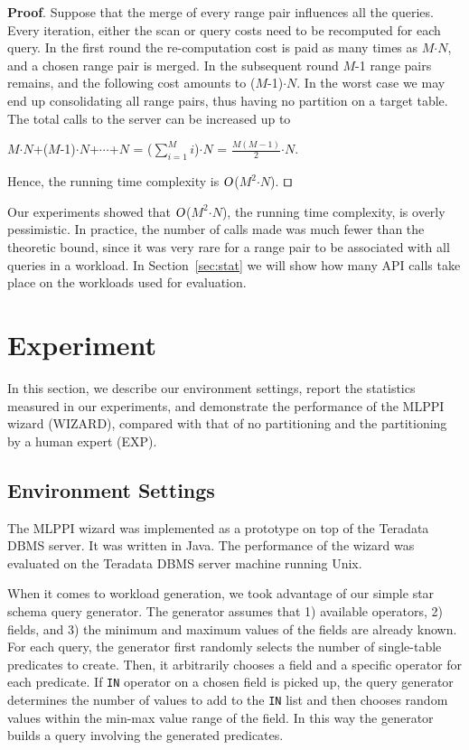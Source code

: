 \documentclass[runningheads]{comsis2}
\def\BigO{\mbox{\sl O}}
\begin{document}
{\bf Proof}. Suppose that the merge of every range pair influences all the queries. 
Every iteration, either the scan or query costs need to be recomputed 
for each query. 
In the first round the \hbox{re-computation} cost is paid as many times as $M${$\cdot$}$N$, 
and a chosen range pair is merged. In the subsequent round 
$M$-1 range pairs remains, and the following cost amounts to ($M$-1){$\cdot$}$N$. 
In the worst case we may end up consolidating all range pairs, thus having no partition on 
a target table. The total calls to the server can be increased up to 

\begin{center}
$M${$\cdot$}$N$+($M$-1){$\cdot$}$N$+$\cdots$+$N$ = ($\sum_{i=1}^M i$){$\cdot$}$N$ = $\frac{M(M-1)}{2}${$\cdot$}$N$. 
\end{center}

\noindent Hence, the running time complexity is $\BigO$($M^{2}${$\cdot$}$N$). $\qed$


Our experiments showed that $\BigO$($M^{2}${$\cdot$}$N$), the running time complexity, 
is overly pessimistic. 
In \hbox{practice}, the number of calls made was much fewer than the \hbox{theoretic} bound, 
since it was very rare for a range pair to be associated with all queries in a workload. 
In \hbox{Section}~\ref{sec:stat} we will show how many API calls take place on the workloads 
used for evaluation. 

\section{Experiment}
\label{sec:experiment}

In this section, we describe our environment settings, 
report the statistics measured in our experiments, and 
demonstrate the performance of the MLPPI wizard (WIZARD), compared with 
that of no partitioning and the partitioning by a human expert (EXP). 

\subsection{Environment Settings}
\label{sec:env_set}

The MLPPI wizard was implemented as a prototype 
on top of the Teradata DBMS server. 
It was written in Java. 
The performance of the wizard was evaluated 
on the Teradata DBMS server machine running Unix. 

When it comes to workload generation, we took advantage of 
our simple star schema query \hbox{generator}. 
The generator assumes that 1) available operators, 2) fields, 
and 3) the minimum and \hbox{maximum} values of the fields are already known. 
For each query, the generator first randomly selects the number of single-table 
predicates to create. 
Then, it arbitrarily chooses a field and a specific operator 
for each predicate. 
If {\tt IN} operator on a chosen field is picked up, the query generator 
determines the number of values to add to the {\tt IN} list and then chooses random values within the min-max value 
range of the field. 
In this way the generator builds a query involving the generated predicates.
\end{document}

